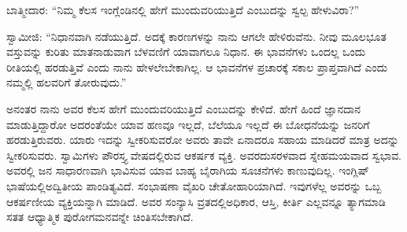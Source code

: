 \vskip 4pt

ಬಾತ್ಮೀದಾರ: “ನಿಮ್ಮ ಕೆಲಸ ಇಂಗ್ಲೆಂಡಿನಲ್ಲಿ ಹೇಗೆ ಮುಂದುವರಿಯುತ್ತಿದೆ ಎಂಬುದನ್ನು ಸ್ವಲ್ಪ ಹೇಳುವಿರಾ?”

\vskip 4pt

ಸ್ವಾಮೀಜಿ: “ನಿಧಾನವಾಗಿ ನಡೆಯುತ್ತಿದೆ. ಅದಕ್ಕೆ ಕಾರಣಗಳನ್ನು ನಾನು ಆಗಲೇ ಹೇಳಿರುವೆನು. ನೀವು ಮೂಲಭೂತ ವಸ್ತುವನ್ನು ಕುರಿತು ಮಾತನಾಡುವಾಗ ಬೆಳವಣಿಗೆ ಯಾವಾಗಲೂ ನಿಧಾನ. ಈ ಭಾವನೆಗಳು ಒಂದಲ್ಲ ಒಂದು ರೀತಿಯಲ್ಲಿ ಹರಡುತ್ತಿವೆ ಎಂದು ನಾನು ಹೇಳಲೇಬೇಕಾಗಿಲ್ಲ. ಆ ಭಾವನೆಗಳ ಪ್ರಚಾರಕ್ಕೆ ಸಕಾಲ ಪ್ರಾಪ್ತವಾಗಿದೆ ಎಂದು ನಮ್ಮಲ್ಲಿ ಹಲವರಿಗೆ ತೋರುವುದು.”

\vskip 4pt

ಅನಂತರ ನಾನು ಅವರ ಕೆಲಸ ಹೇಗೆ ಮುಂದುವರಿಯುತ್ತಿದೆ ಎಂಬುದನ್ನು ಕೇಳಿದೆ. ಹೇಗೆ ಹಿಂದೆ ಜ್ಞಾನದಾನ ಮಾಡುತ್ತಿದ್ದಾರೋ ಅದರಂತೆಯೇ ಯಾವ ಹಣವೂ ಇಲ್ಲದೆ, ಬೆಲೆಯೂ ಇಲ್ಲದೆ ಈ ಬೋಧನೆಯನ್ನು ಜನರಿಗೆ ಹರಡುತ್ತಿರುವರು. ಯಾರು ಇದನ್ನು ಸ್ವೀಕರಿಸುವರೋ ಅವರು ತಾವೇ ಏನಾದರೂ ಸಹಾಯ ಮಾಡಿದರೆ ಮಾತ್ರ ಅದನ್ನು ಸ್ವೀಕರಿಸುವರು. ಸ್ವಾಮಿಗಳು ಪೌರಸ್ತ್ಯ ವೇಷದಲ್ಲಿರುವ ಆಕರ್ಷಕ ವ್ಯಕ್ತಿ. ಅವರದು\break ಸರಳವಾದ ಸ್ನೇಹಮಯವಾದ ಸ್ವಭಾವ. ಅವರಲ್ಲಿ ಜನ ಸಾಧಾರಣವಾಗಿ ಭಾವಿಸುವ ಯಾವ ಬಾಹ್ಯ ಬೈರಾಗಿಯ ಸೂಚನೆಗಳು ಕಾಣುವುದಿಲ್ಲ. ಇಂಗ್ಲಿಷ್​ ಭಾಷೆಯಲ್ಲಿ\break ಅದ್ವಿತೀಯ ಪಾಂಡಿತ್ಯವಿದೆ. ಸಂಭಾಷಣಾ ವೈಖರಿ ಚೇತೋಹಾರಿಯಾಗಿದೆ. ಇವುಗಳೆಲ್ಲ ಅವರನ್ನು ಒಬ್ಬ ಆಕರ್ಷಣೀಯ ವ್ಯಕ್ತಿಯನ್ನಾಗಿ ಮಾಡಿದೆ. ಅವರ ಸಂನ್ಯಾಸಿ ವ್ರತದಲ್ಲಿ\break ಅಧಿಕಾರ, ಆಸ್ತಿ, ಕೀರ್ತಿ ಎಲ್ಲವನ್ನೂ ತ್ಯಾಗಮಾಡಿ ಸತತ ಆಧ್ಯಾತ್ಮಿಕ ಪುರೋಗಮನವನ್ನೇ ಚಿಂತಿಸಬೇಕಾಗಿದೆ.

